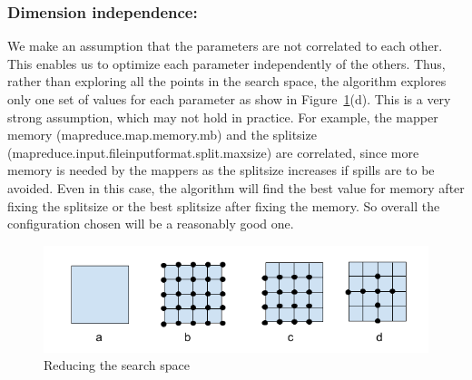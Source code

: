 \noindent\subsubsection*{\bf Dimension independence: } 
We make an assumption that the parameters are not correlated to each other. This enables us to optimize each parameter independently of the others. Thus, rather than exploring all the points in the search space, the algorithm explores only one set of values for each parameter as show in Figure~\ref{fig:searchspace}(d). This is a very strong assumption, which may not hold in practice. For example, the mapper memory (mapreduce.map.memory.mb) and the splitsize (mapreduce.input.fileinputformat.split.maxsize) are correlated, since more memory is needed by the mappers as the splitsize increases if spills are to be avoided. Even in this case, the algorithm will find the best value for memory after fixing the splitsize or the best splitsize after fixing the memory. So overall the configuration chosen will be a reasonably good one.
\begin{figure}[h]
	\includegraphics[width=\linewidth]{fig/searchspace.png}
	\caption{Reducing the search space}
	\label{fig:searchspace}
\end{figure}

